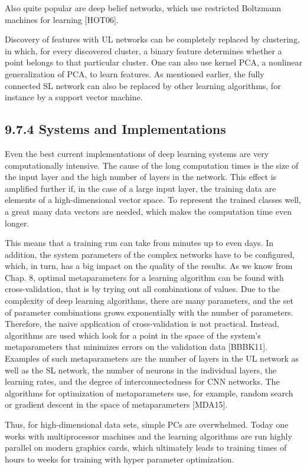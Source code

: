 \documentclass[10pt]{book}
\begin{document}
\begin{center}
\begin{enumerate}
\begin{center}
\begin{center}
\begin{center}
Also quite popular are deep belief networks, which use restricted Boltzmann machines for learning [HOT06].

Discovery of features with UL networks can be completely replaced by clustering, in which, for every discovered cluster, a binary feature determines whether a point belongs to that particular cluster. One can also use kernel PCA, a nonlinear generalization of PCA, to learn features. As mentioned earlier, the fully connected SL network can also be replaced by other learning algorithms, for instance by a support vector machine.

\subsection*{9.7.4 Systems and Implementations}
Even the best current implementations of deep learning systems are very computationally intensive. The cause of the long computation times is the size of the input layer and the high number of layers in the network. This effect is amplified further if, in the case of a large input layer, the training data are elements of a high-dimensional vector space. To represent the trained classes well, a great many data vectors are needed, which makes the computation time even longer.


This means that a training run can take from minutes up to even days. In addition, the system parameters of the complex networks have to be configured, which, in turn, has a big impact on the quality of the results. As we know from Chap. 8, optimal metaparameters for a learning algorithm can be found with cross-validation, that is by trying out all combinations of values. Due to the complexity of deep learning algorithms, there are many parameters, and the set of parameter combinations grows exponentially with the number of parameters. Therefore, the naive application of cross-validation is not practical. Instead, algorithms are used which look for a point in the space of the system's metaparameters that minimizes errors on the validation data [BBBK11]. Examples of such metaparameters are the number of layers in the UL network as well as the SL network, the number of neurons in the individual layers, the learning rates, and the degree of interconnectedness for CNN networks. The algorithms for optimization of metaparameters use, for example, random search or gradient descent in the space of metaparameters [MDA15].

Thus, for high-dimensional data sets, simple PCs are overwhelmed. Today one works with multiprocessor machines and the learning algorithms are run highly parallel on modern graphics cards, which ultimately leads to training times of hours to weeks for training with hyper parameter optimization.


\end{center}
\end{center}
\end{center}
\end{enumerate}
\end{center}
\end{document}
